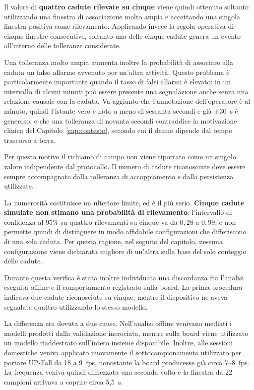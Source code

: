 Il valore di \textbf{quattro cadute rilevate su cinque} viene quindi ottenuto soltanto utilizzando una finestra di associazione molto ampia e accettando una singola finestra positiva come rilevamento. Applicando invece la regola operativa di cinque finestre consecutive, soltanto una delle cinque cadute genera un evento all'interno delle tolleranze considerate.

Una tolleranza molto ampia aumenta inoltre la probabilità di associare alla caduta un falso allarme avvenuto per un'altra attività. Questo problema è particolarmente importante quando il tasso di falsi allarmi è elevato: in un intervallo di alcuni minuti può essere presente una segnalazione anche senza una relazione causale con la caduta. Va aggiunto che l'annotazione dell'operatore è al minuto, quindi l'istante vero è noto a meno di sessanta secondi e già $\pm30$~s è generoso; e che una tolleranza di novanta secondi contraddice la motivazione clinica del Capitolo~\ref{cap:contesto}, secondo cui il danno dipende dal tempo trascorso a terra.

Per questo motivo il richiamo di campo non viene riportato come un singolo valore indipendente dal protocollo. Il numero di cadute riconosciute deve essere sempre accompagnato dalla tolleranza di accoppiamento e dalla persistenza utilizzate.

La numerosità costituisce un ulteriore limite, ed è il più serio. \textbf{Cinque cadute simulate non stimano una probabilità di rilevamento}: l'intervallo di confidenza al 95\% su quattro rilevamenti su cinque va da $0{,}28$ a $0{,}99$, e non permette quindi di distinguere in modo affidabile configurazioni che differiscono di una sola caduta. Per questa ragione, nel seguito del capitolo, nessuna configurazione viene dichiarata migliore di un'altra sulla base del solo conteggio delle cadute.

Durante questa verifica è stata inoltre individuata una discordanza fra l'analisi eseguita offline e il comportamento registrato sulla board. La prima procedura indicava due cadute riconosciute su cinque, mentre il dispositivo ne aveva segnalate quattro utilizzando lo stesso modello.

La differenza era dovuta a due cause. Nell'analisi offline venivano mediati i modelli prodotti dalla validazione incrociata, mentre sulla board viene utilizzato un modello riaddestrato sull'intero insieme disponibile. Inoltre, alle sessioni domestiche veniva applicato nuovamente il sottocampionamento utilizzato per portare UP-Fall da 18 a 9~fps, nonostante la board producesse già circa 7--8~fps. La frequenza veniva quindi dimezzata una seconda volta e la finestra da 22 campioni arrivava a coprire circa 5,5~s.

